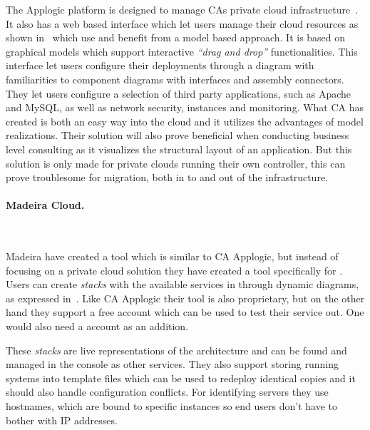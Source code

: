The Applogic platform is designed to manage CAs private cloud 
infrastructure~\cite{introducing-cloud-services}.
It also has a web based interface which let users manage their cloud resources 
as shown in~ which use and benefit from a model based approach.
It is based on graphical models which support interactive \emph{``drag and drop''} functionalities.
This interface let users configure their deployments through a diagram with familiarities to 
 component diagrams with interfaces and assembly connectors. 
They let users configure a selection of third party applications, 
such as Apache and MySQL, as well as network security, instances and monitoring. 
What CA has created is both an easy way into the cloud and it utilizes 
the advantages of model realizations. 
Their solution will also prove beneficial when conducting business level consulting
as it visualizes the structural layout of an application.
But this solution is only made for private clouds running their own controller, 
this can prove troublesome for migration, both in to and out of the infrastructure.

\paragraph{Madeira Cloud.}~\cite{madeiracloud}



Madeira have created a tool which is similar to CA Applogic, but instead of focusing
on a private cloud solution they have created a tool specifically for  .
Users can create \emph{stacks} with the available services in  through 
dynamic diagrams, as expressed in~.
Like CA Applogic their tool is also proprietary, but on the other hand they support
a free account which can be used to test their service out.
One would also need a  account as an addition.

These \emph{stacks} are live representations of the architecture and can be found 
and managed in the  console as other  services.
They also support storing running systems into template files which can be used
to redeploy identical copies and it should also handle configuration conflicts.
For identifying servers they use hostnames, which are bound to specific instances 
so end users don't have to bother with IP addresses.


